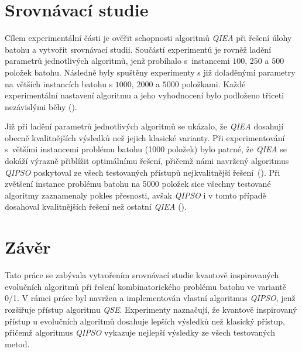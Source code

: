 \documentclass[czech]{ExcelAtFIT} %
\begin{document}
\section{Srovnávací studie}
Cílem experimentální části je ověřit schopnosti algoritmů \emph{QIEA} při řešení úlohy batohu a vytvořit srovnávací studii. 
Součástí experimentů je rovněž ladění parametrů jednotlivých algoritmů, jenž probíhalo s~instancemi $100$, $250$ a $500$ položek batohu. 
Následně byly spuštěny experimenty s již doladěnými parametry na větších instancích batohu s $1000$, $2000$ a $5000$ položkami. 
Každé experimentální nastavení algoritmu a jeho vyhodnocení bylo podloženo třiceti nezávislými běhy ().

Již při ladění parametrů jednotlivých algoritmů se ukázalo, že \emph{QIEA} dosahují obecně kvalitnějších výsledků než jejich klasické varianty. 
Při experimentování s~většími instancemi problému batohu (1000 položek) bylo patrné, že \emph{QIEA} se dokáží výrazně přiblížit optimálnímu řešení, přičemž námi navržený algoritmus \emph{QIPSO} poskytoval ze všech testovaných přístupů nejkvalitnější řešení~(). 
Při zvětšení instance problému batohu na 5000 položek sice všechny testované algoritmy zaznamenaly pokles přesnosti, avšak \emph{QIPSO} i v tomto případě dosahoval kvalitnějších řešení než ostatní \emph{QIEA} (). 

\section{Závěr}
Tato práce se zabývala vytvořením srovnávací studie kvantově inspirovaných evolučních algoritmů při řešení kombinatorického problému batohu ve variantě 0/1. 
V rámci práce byl navržen a implementován vlastní algoritmus \emph{QIPSO}, jenž rozšiřuje přístup algoritmu \emph{QSE}.
Experimenty naznačují, že kvantově inspirovaný přístup u evolučních algoritmů dosahuje lepších výsledků než klasický přístup, přičemž algoritmus \emph{QIPSO} vykazuje nejlepší výsledky ze všech testovaných metod. 

\end{document}
